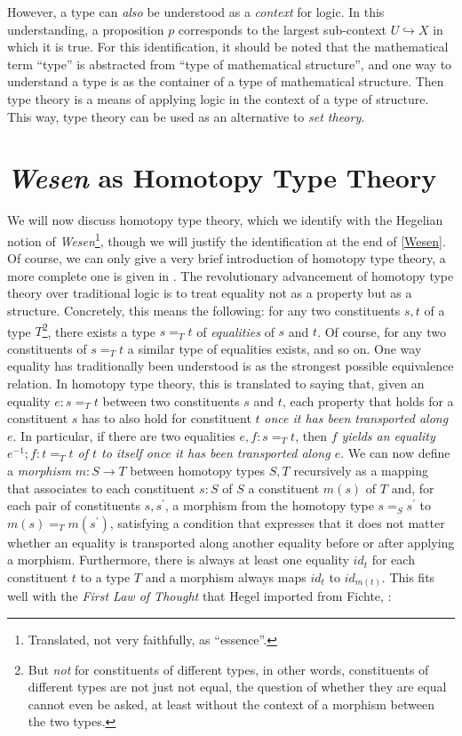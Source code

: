 \documentclass{article}
\begin{document}
However, a type can \emph{also} be understood as a \emph{context} for logic.  In this understanding, a
proposition $p$ corresponds to the largest sub-context $U\hookrightarrow X$ in which it is true. For this
identification, it should be noted that the mathematical term ``type'' is abstracted from ``type of mathematical
structure'', and one way to understand a type is as the container of a type of mathematical structure.
Then type theory is a means of applying logic in the context of a type of structure. This way, type theory
can be used as an alternative to \emph{set theory}.


\section{\emph{Wesen} as Homotopy Type Theory}\label{Hott}
We will now discuss homotopy type theory, which we identify with the Hegelian notion of \emph{Wesen}\footnote{Translated,
not very faithfully, as ``essence''.}, though we will justify the identification at the end of \ref{Wesen}.
Of course, we can only give a very brief introduction of homotopy type theory, a more complete one is
given in \cite{Shuhott}. The revolutionary advancement of homotopy type theory over traditional logic
is to treat equality not as a property but as a structure. Concretely, this means the following: for any
two constituents $s,t$ of a type $T$\footnote{But \emph{not} for constituents of different types, in other
words, constituents of different types are not just not equal, the question of whether they are equal
cannot even be asked, at least without the context of a morphism between the two types.}, there exists
a type $s=_T t$ of \emph{equalities} of $s$ and $t$. Of course, for any two constituents of $s=_T t$ a
similar type of equalities exists, and so on. One way equality has traditionally been understood is as
the strongest possible equivalence relation. In homotopy type theory, this is translated to saying that,
given an equality $e:s=_T t$ between two constituents $s$ and $t$, each property that holds for a constituent
$s$ has to also hold for constituent $t$ \emph{once it has been transported along $e$}. In particular,
if there are two equalities $e,f:s=_T t$, then \emph{$f$ yields an equality $e^{-1};f:t=_T t$ of $t$ to
itself once it has been transported along $e$}. We can now define a \emph{morphism} $m:S\rightarrow T$
between homotopy types $S,T$ recursively as a mapping that associates to each constituent $s:S$ of $S$
a constituent $m(s)$ of $T$ and, for each pair of constituents $s,s^{\prime}$, a morphism from the homotopy
type $s=_{S} s^{\prime}$ to $m(s)=_T m(s^{\prime})$, satisfying a condition that expresses that it does
not matter whether an equality is transported along another equality before or after applying a morphism.
Furthermore, there is always at least one equality $id_t$ for each constituent $t$ to a type $T$ and a
morphism always maps $id_t$ to $id_{m(t)}$. This fits well with the \emph{First Law of Thought} that Hegel
imported from Fichte, \cite{Fichte}:
\end{document}
